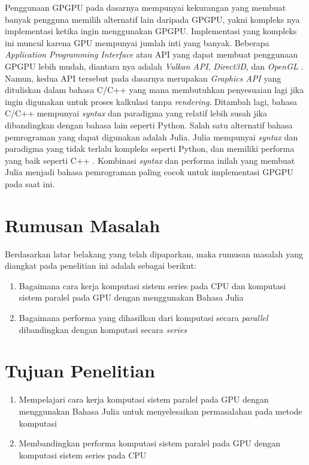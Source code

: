 
Penggunaan GPGPU pada dasarnya mempunyai kekurangan yang membuat banyak
pengguna memilih alternatif lain daripada GPGPU, yakni kompleks nya
implementasi ketika ingin menggunakan GPGPU. Implementasi yang kompleks ini
muncul karena GPU mempunyai jumlah inti yang banyak. Beberapa \emph{Application
	Programming Interface} atau API \citep{evansonExplainerWhatAPI2021} yang dapat
membuat penggunaan GPGPU lebih mudah, diantara nya adalah \emph{Vulkan API},
\emph{Direct3D}, dan \emph{OpenGL}
\citep{khairySurveyArchitecturalApproaches2019}. Namun, kedua API tersebut pada
dasarnya merupakan \emph{Graphics API} yang dituliskan dalam bahasa C/C++ yang
mana membutuhkan penyesuaian lagi jika ingin digunakan untuk proses kalkulasi
tanpa \emph{rendering}. Ditambah lagi, bahasa C/C++ mempunyai \emph{syntax} dan
paradigma yang relatif lebih susah jika dibandingkan dengan bahasa lain seperti
Python. Salah satu alternatif bahasa pemrograman yang dapat digunakan adalah
Julia. Julia mempunyai \emph{syntax} dan paradigma yang tidak terlalu kompleks seperti
Python, dan memiliki performa yang baik seperti C++
\cite{bezansonJuliaMicroBenchmarks2023}. Kombinasi \emph{syntax} dan performa inilah
yang membuat Julia menjadi bahasa pemrograman paling cocok untuk implementasi
GPGPU pada saat ini.

\section{Rumusan Masalah}
Berdasarkan latar belakang yang telah dipaparkan, maka rumusan masalah yang
diangkat pada penelitian ini adalah sebagai berikut:
\begin{enumerate}
	\item Bagaimana cara kerja komputasi sistem series pada CPU dan komputasi sistem paralel pada GPU dengan menggunakan
	      Bahasa Julia

	\item Bagaimana performa yang dihasilkan dari komputasi secara \emph{parallel}
	      dibandingkan dengan komputasi secara \emph{series}
\end{enumerate}

\section{Tujuan Penelitian}
\begin{enumerate}
	\item Mempelajari cara kerja komputasi sistem paralel pada GPU dengan menggunakan Bahasa Julia
	      untuk menyelesaikan permasalahan pada metode komputasi

	\item Membandingkan performa komputasi sistem paralel pada GPU dengan komputasi sistem series pada CPU
\end{enumerate}

